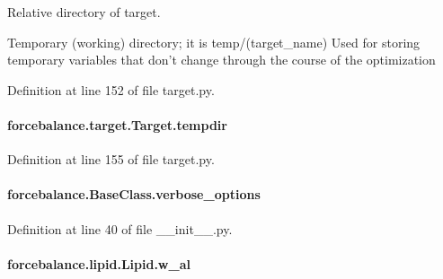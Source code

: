 Relative directory of target. 

Temporary (working) directory; it is temp/(target\-\_\-name) Used for storing temporary variables that don't change through the course of the optimization 

Definition at line 152 of file target.\-py.

\hypertarget{classforcebalance_1_1target_1_1Target_aa1f01b5b78db253b5b66384ed11ed193}{
\paragraph[{tempdir}]{\setlength{\rightskip}{0pt plus 5cm}forcebalance.\-target.\-Target.\-tempdir\hspace{0.3cm}{\ttfamily [inherited]}}}\label{classforcebalance_1_1target_1_1Target_aa1f01b5b78db253b5b66384ed11ed193}


Definition at line 155 of file target.\-py.

\hypertarget{classforcebalance_1_1BaseClass_afd68efa29ccd2f320f4cf82198214aac}{
\paragraph[{verbose\-\_\-options}]{\setlength{\rightskip}{0pt plus 5cm}forcebalance.\-Base\-Class.\-verbose\-\_\-options\hspace{0.3cm}{\ttfamily [inherited]}}}\label{classforcebalance_1_1BaseClass_afd68efa29ccd2f320f4cf82198214aac}


Definition at line 40 of file \-\_\-\-\_\-init\-\_\-\-\_\-.\-py.

\hypertarget{classforcebalance_1_1lipid_1_1Lipid_a204f491eb38e8a8570c74d7eaf3d940a}{
\paragraph[{w\-\_\-al}]{\setlength{\rightskip}{0pt plus 5cm}forcebalance.\-lipid.\-Lipid.\-w\-\_\-al\hspace{0.3cm}{\ttfamily [inherited]}}}\label{classforcebalance_1_1lipid_1_1Lipid_a204f491eb38e8a8570c74d7eaf3d940a}



